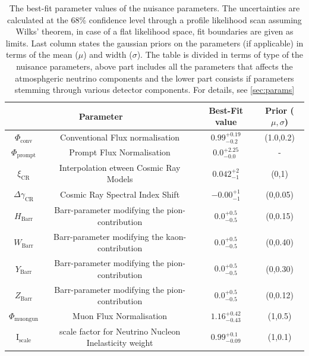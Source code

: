 \begin{table}[h]
    \caption{The best-fit parameter values of the nuisance parameters. The uncertainties are calculated at the 68\% confidence level through a profile likelihood scan assuming Wilks' theorem, in case of a flat likelihood space, fit boundaries are given as limits. Last column states the gaussian priors on the parameters (if applicable) in terms of the mean ($\mu$) and width ($\sigma$). The table is divided in terms of type of the nuisance parameters, above part includes all the parameters that affects the atmosphgeric neutrino components and the lower part consists if parameters stemming through various detector components. For details, see \ref{sec:params}}
    {\renewcommand{\arraystretch}{1.4}
    \begin{tabular}{ c c |c|c}
        \hline
        \multicolumn{2}{c|}{Parameter}  & Best-Fit value & Prior ($\mu,\sigma$)\\
        \hline
        \hline
        $\Phi_{\mathrm{conv}}$& Conventional Flux normalisation & $0.99_{-0.2}^{+0.19}$ & (1.0,0.2)\\
        \hline
        $\Phi_{\mathrm{prompt}}$& Prompt Flux Normalisation & ${0.0}_{-0.0}^{+2.25}$ & - \\
        \hline
        $\xi_{\mathrm{CR}}$& Interpolation etween Cosmic Ray Models & $0.042_{-1}^{+2}$ & (0,1)\\
        \hline
        $\Delta\gamma_{\mathrm{CR}}$& Cosmic Ray Spectral Index Shift & $-0.00_{-1}^{+1}$ & (0,0.05)\\
        \hline
        $H_{\mathrm{Barr}}$& Barr-parameter modifying the pion-contribution & $0.0_{-0.5}^{+0.5}$ & (0,0.15)\\
        \hline
        $W_{\mathrm{Barr}}$& Barr-parameter modifying the kaon-contribution & $0.0_{-0.5}^{+0.5}$ & (0,0.40)\\
        \hline
        $Y_{\mathrm{Barr}}$& Barr-parameter modifying the pion-contribution & $0.0_{-0.5}^{+0.5}$ & (0,0.30)\\
        \hline
        $Z_{\mathrm{Barr}}$& Barr-parameter modifying the pion-contribution & $0.0_{-0.5}^{+0.5}$ & (0,0.12)\\
        \hline
        $\Phi_{\mathrm{muongun}}$ & Muon Flux Normalisation & $1.16_{-0.43}^{+0.42}$ & (1,0.5)\\
        \hline
        $\mathrm{I}_{\mathrm{scale}}$ & scale factor for Neutrino Nucleon Inelasticity weight & $0.99_{-0.09}^{+0.1}$ & (1,0.1)\\
        \hline
        

\end{tabular}}
\end{table}
